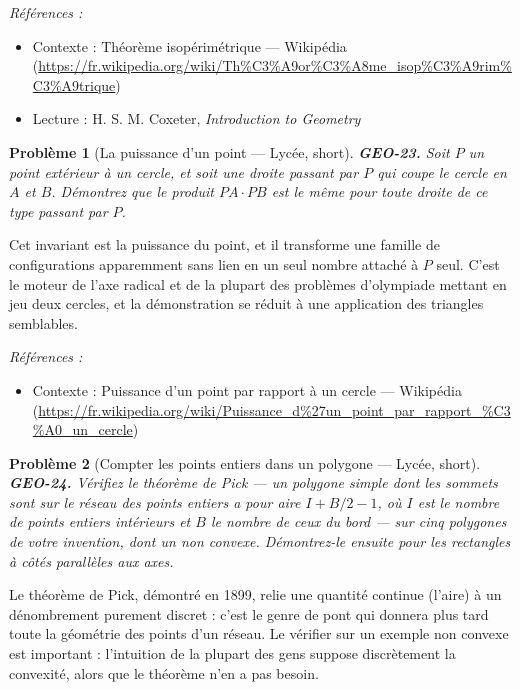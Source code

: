 \documentclass[11pt]{article}
\newtheorem{problem}{Problème}
\newenvironment{refs}{\par\small\noindent\emph{Références :}\begin{itemize}\setlength\itemsep{0pt}}{\end{itemize}\normalsize}
\begin{document}
\begin{refs}
\item Contexte : Théorème isopérimétrique --- Wikipédia (\url{https://fr.wikipedia.org/wiki/Th%C3%A9or%C3%A8me_isop%C3%A9rim%C3%A9trique})
\item Lecture : H. S. M. Coxeter, \textit{Introduction to Geometry}
\end{refs}

\bigskip

\begin{problem}[{La puissance d'un point --- Lycée, short}]
\textbf{GEO-23.} Soit $ P $ un point extérieur à un cercle, et soit une droite passant par $ P $ qui coupe le cercle en $ A $ et $ B $. Démontrez que le produit $ PA \cdot PB $ est le même pour toute droite de ce type passant par $ P $.
\end{problem}

\noindent Cet invariant est la puissance du point, et il transforme une famille de configurations apparemment sans lien en un seul nombre attaché à $ P $ seul. C'est le moteur de l'axe radical et de la plupart des problèmes d'olympiade mettant en jeu deux cercles, et la démonstration se réduit à une application des triangles semblables.

\begin{refs}
\item Contexte : Puissance d'un point par rapport à un cercle --- Wikipédia (\url{https://fr.wikipedia.org/wiki/Puissance_d%27un_point_par_rapport_%C3%A0_un_cercle})
\end{refs}

\bigskip

\begin{problem}[{Compter les points entiers dans un polygone --- Lycée, short}]
\textbf{GEO-24.} Vérifiez le théorème de Pick --- un polygone simple dont les sommets sont sur le réseau des points entiers a pour aire $ I + B/2 - 1 $, où $ I $ est le nombre de points entiers intérieurs et $ B $ le nombre de ceux du bord --- sur cinq polygones de votre invention, dont un non convexe. Démontrez-le ensuite pour les rectangles à côtés parallèles aux axes.
\end{problem}

\noindent Le théorème de Pick, démontré en 1899, relie une quantité continue (l'aire) à un dénombrement purement discret : c'est le genre de pont qui donnera plus tard toute la géométrie des points d'un réseau. Le vérifier sur un exemple non convexe est important : l'intuition de la plupart des gens suppose discrètement la convexité, alors que le théorème n'en a pas besoin.
\end{document}
